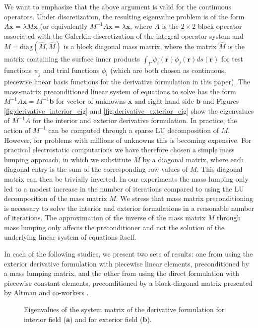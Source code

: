 We want to emphasize that the above argument is valid for the continuous operators.
Under discretization, the resulting eigenvalue problem is of the form $A\mathbf{x}=\lambda M\mathbf{x}$ (or equivalently $M^{-1}A\mathbf{x}=\lambda \mathbf{x}$, where $A$ is the $2\times 2$ block operator associated with the Galerkin discretization of the integral operator system and $M = \text{diag}(\hat{M}, \hat{M})$ is a block diagonal mass matrix, where the matrix $\hat{M}$ is the matrix containing the surface inner products $\int_{\Gamma}\psi_i(\mathbf{r})\phi_j(\mathbf{r})ds(\mathbf{r})$ for test functions $\psi_j$ and trial functions $\phi_i$ (which are both chosen as continuous, piecewise linear basis functions for the derivative formulation in this paper).
The mass-matrix preconditioned linear system of equations to solve has the form $M^{-1}A\mathbf{x} = M^{-1}\mathbf{b}$ for vector of unknowns $\mathbf{x}$ and right-hand side $\mathbf{b}$ and Figures \ref{fig:derivative_interior_eig} and \ref{fig:derivative_exterior_eig} show the eigenvalues of $M^{-1}A$ for the interior and exterior derivative formulation.
In practice, the action of $M^{-1}$ can be computed through a sparse LU decomposition of $M$.
However, for problems with millions of unknowns this is becoming expensive.
For practical electrostatic computations we have therefore chosen a simple mass lumping approach, in which we substitute $M$ by a diagonal matrix, where each diagonal entry is the sum of the corresponding row values of $M$.
This diagonal matrix can then be trivially inverted.
In our experiments the mass lumping only led to a modest increase in the number of iterations compared to using the LU decomposition of the mass matrix $M$.
We stress that mass matrix preconditioning is necessary to solve the interior and exterior formulations in a reasonable number of iterations.
The approximation of the inverse of the mass matrix $M$ through mass lumping only affects the preconditioner and not the solution of the underlying linear system of equations itself.

In each of the following studies, we present two sets of results: one from using the exterior derivative formulation with piecewise linear elements, preconditioned by a mass lumping matrix, and the other from using the direct formulation with piecewise constant elements, preconditioned by a block-diagonal matrix presented by Altman and co-workers \cite{AltmanBardhanWhiteTidor2009}.


\begin{figure*}
    \begin{center}
        \qquad
    \end{center}
    \caption{Eigenvalues of the system matrix of the derivative formulation for interior field (\textbf{a}) and for exterior field (\textbf{b}).
    }
\end{figure*}

